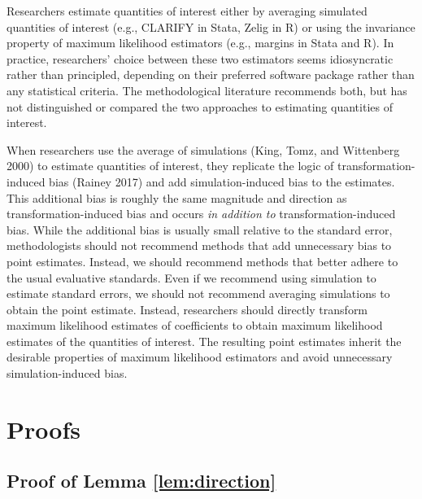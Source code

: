 \documentclass[12pt]{article}
\begin{document}
Researchers estimate quantities of interest either by averaging simulated quantities of interest (e.g., CLARIFY in Stata, Zelig in R) or using the invariance property of maximum likelihood estimators (e.g., margins in Stata and R). In practice, researchers' choice between these two estimators seems idiosyncratic rather than principled, depending on their preferred software package rather than any statistical criteria. The methodological literature recommends both, but has not distinguished or compared the two approaches to estimating quantities of interest.

When researchers use the average of simulations (King, Tomz, and Wittenberg 2000) to estimate quantities of interest, they replicate the logic of transformation-induced bias (Rainey 2017) and add simulation-induced bias to the estimates. This additional bias is roughly the same magnitude and direction as transformation-induced bias and occurs \textit{in addition to} transformation-induced bias. While the additional bias is usually small relative to the standard error, methodologists should not recommend methods that add unnecessary bias to point estimates. Instead, we should recommend methods that better adhere to the usual evaluative standards. Even if we recommend using simulation to estimate standard errors, we should not recommend averaging simulations to obtain the point estimate. Instead, researchers should directly transform maximum likelihood estimates of coefficients to obtain maximum likelihood estimates of the quantities of interest. The resulting point estimates inherit the desirable properties of maximum likelihood estimators and avoid unnecessary simulation-induced bias.

\singlespace
\small



\newpage
\appendix


\section{Proofs}\label{appendix:proofs}

\subsection{Proof of Lemma \ref{lem:direction}}
\end{document}
